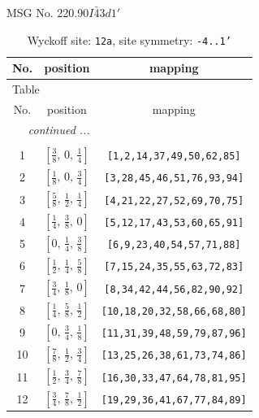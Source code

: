 \documentclass[fleqn,8pt]{jsarticle}
\begin{document}
\setcounter{MaxMatrixCols}{32}

\renewcommand{\tablename}{Table~}
\renewcommand{\figurename}{Figure~}
\begin{center}
\LARGE
MSG No. 220.90\quad$I\bar{4}3d1'$
\end{center}
\renewcommand{\arraystretch}{1.2}
\begin{longtable}{ccc}
\caption{Wyckoff site: {\tt 12a}, site symmetry: {\tt -4..1'}}
 \\
 \hline \hline
No. & position & mapping \\ \hline \endfirsthead

\multicolumn{2}{l}{\tablename\ \thetable{}} \\
 \hline \hline
No. & position & mapping \\ \hline \endhead

 \hline \hline
\multicolumn{2}{r}{\footnotesize\it continued ...} \\ \endfoot

 \hline \hline
\multicolumn{2}{r}{} \\ \endlastfoot

1 & $\left[ \frac{3}{8},\, 0,\, \frac{1}{4} \right]$ & {\tt [1,2,14,37,49,50,62,85]} \\ \hline
2 & $\left[ \frac{1}{8},\, 0,\, \frac{3}{4} \right]$ & {\tt [3,28,45,46,51,76,93,94]} \\ \hline
3 & $\left[ \frac{5}{8},\, \frac{1}{2},\, \frac{1}{4} \right]$ & {\tt [4,21,22,27,52,69,70,75]} \\ \hline
4 & $\left[ \frac{1}{4},\, \frac{3}{8},\, 0 \right]$ & {\tt [5,12,17,43,53,60,65,91]} \\ \hline
5 & $\left[ 0,\, \frac{1}{4},\, \frac{3}{8} \right]$ & {\tt [6,9,23,40,54,57,71,88]} \\ \hline
6 & $\left[ \frac{1}{2},\, \frac{1}{4},\, \frac{5}{8} \right]$ & {\tt [7,15,24,35,55,63,72,83]} \\ \hline
7 & $\left[ \frac{3}{4},\, \frac{1}{8},\, 0 \right]$ & {\tt [8,34,42,44,56,82,90,92]} \\ \hline
8 & $\left[ \frac{1}{4},\, \frac{5}{8},\, \frac{1}{2} \right]$ & {\tt [10,18,20,32,58,66,68,80]} \\ \hline
9 & $\left[ 0,\, \frac{3}{4},\, \frac{1}{8} \right]$ & {\tt [11,31,39,48,59,79,87,96]} \\ \hline
10 & $\left[ \frac{7}{8},\, \frac{1}{2},\, \frac{3}{4} \right]$ & {\tt [13,25,26,38,61,73,74,86]} \\ \hline
11 & $\left[ \frac{1}{2},\, \frac{3}{4},\, \frac{7}{8} \right]$ & {\tt [16,30,33,47,64,78,81,95]} \\ \hline
12 & $\left[ \frac{3}{4},\, \frac{7}{8},\, \frac{1}{2} \right]$ & {\tt [19,29,36,41,67,77,84,89]} \\
\end{longtable}
\end{document}
